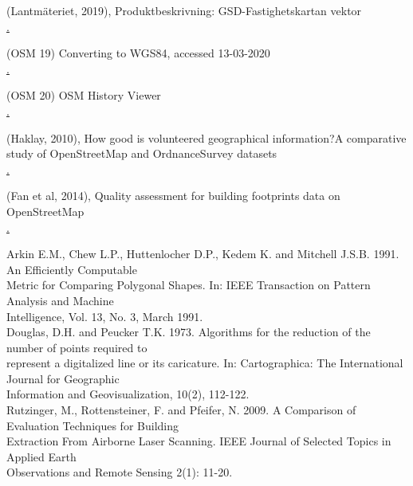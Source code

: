 \documentclass[a4paper]{article}
\begin{document}
\begin{thebibliography}{9}

(Lantmäteriet, 2019), Produktbeskrivning: GSD-Fastighetskartan vektor \\ 
\href{https://www.lantmateriet.se/globalassets/kartor-och-geografisk-information/kartor/fastshmi.pdf}.

(OSM 19) Converting to WGS84, accessed 13-03-2020 \\ 
\href{https://wiki.openstreetmap.org/wiki/Converting\_to\_WGS84}.

(OSM 20) OSM History Viewer\\
\href{https://wiki.openstreetmap.org/wiki/OSM\_History\_Viewer}.

(Haklay, 2010), How good is volunteered geographical information?A comparative study of OpenStreetMap and OrdnanceSurvey datasets \\
\href{https://kfrichter.org/crowdsourcing-material/day1/haklay10.pdf}.

(Fan et al, 2014), Quality assessment for building footprints data on OpenStreetMap \\
\href{https://www.researchgate.net/publication/262163378\_Quality\_assessment\_for\_building\_footprints\_data\_on\_OpenStreetMap}.

Arkin E.M., Chew L.P., Huttenlocher D.P., Kedem K. and Mitchell J.S.B. 1991. An Efficiently Computable \\
Metric for Comparing Polygonal Shapes. In: IEEE Transaction on Pattern Analysis and Machine \\
Intelligence, Vol. 13, No. 3, March 1991. \\

Douglas, D.H. and Peucker T.K. 1973. Algorithms for the reduction of the number of points required to \\
represent a digitalized line or its caricature. In: Cartographica: The International Journal for Geographic \\
Information and Geovisualization, 10(2), 112-122. \\

Rutzinger, M., Rottensteiner, F. and Pfeifer, N. 2009. A Comparison of Evaluation Techniques for Building \\
Extraction From Airborne Laser Scanning. IEEE Journal of Selected Topics in Applied Earth \\
Observations and Remote Sensing 2(1): 11-20. \\

\end{thebibliography}
\end{document}
